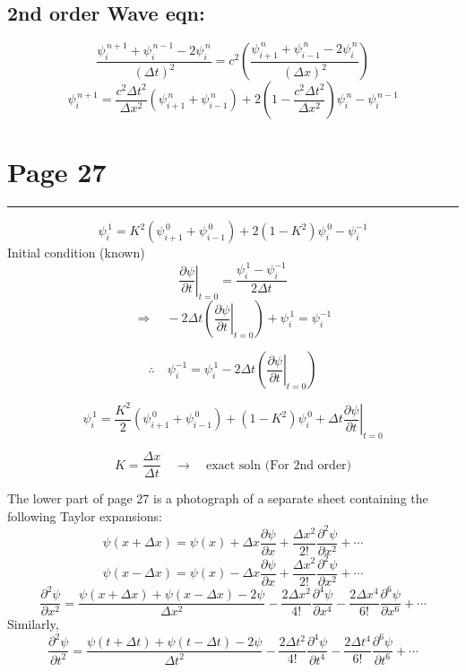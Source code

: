 \documentclass[11pt,a4paper]{article}
\newcommand{\pagehead}[1]{%
  \clearpage
  \section*{Page #1}
  \vspace{-0.6em}
  {\color{black!45}\rule{\linewidth}{0.5pt}}
  \vspace{0.4em}
}
\begin{document}
\subsection*{2nd order Wave eqn:}
\[
\frac{\psi_i^{\,n+1}+\psi_i^{\,n-1}-2\psi_i^{\,n}}{(\Delta t)^2}
=c^2\left(
\frac{\psi_{i+1}^{\,n}+\psi_{i-1}^{\,n}-2\psi_i^{\,n}}{(\Delta x)^2}
\right)
\]
\[
\psi_i^{\,n+1}
=\frac{c^2\Delta t^2}{\Delta x^2}
\left(\psi_{i+1}^{\,n}+\psi_{i-1}^{\,n}\right)
+2\left(1-\frac{c^2\Delta t^2}{\Delta x^2}\right)\psi_i^{\,n}
-\psi_i^{\,n-1}
\]

\pagehead{27}

\[
\psi_i^{\,1}=K^2\left(\psi_{i+1}^{\,0}+\psi_{i-1}^{\,0}\right)
+2\left(1-K^2\right)\psi_i^{\,0}-\psi_i^{-1}
\]
Initial condition (known)
\[
\left.\frac{\partial\psi}{\partial t}\right|_{t=0}
=\frac{\psi_i^{\,1}-\psi_i^{-1}}{2\Delta t}
\]
\[
\Rightarrow\quad -2\Delta t\left(\left.\frac{\partial\psi}{\partial t}
\right|_{t=0}\right)+\psi_i^{\,1}=\psi_i^{-1}
\]
\begin{handbox}
\[
\therefore\quad \psi_i^{-1}
=\psi_i^{\,1}-2\Delta t\left(\left.\frac{\partial\psi}{\partial t}
\right|_{t=0}\right)
\]
\end{handbox}
\begin{handbox}
\[
\psi_i^{\,1}
=\frac{K^2}{2}\left(\psi_{i+1}^{\,0}+\psi_{i-1}^{\,0}\right)
+\left(1-K^2\right)\psi_i^{\,0}
+\Delta t\left.\frac{\partial\psi}{\partial t}\right|_{t=0}
\]
\end{handbox}
\[
K=\frac{\Delta x}{\Delta t}
\quad\longrightarrow\quad \text{exact soln (For 2nd order)}
\]

\begin{notebox}
The lower part of page 27 is a photograph of a separate sheet containing the
following Taylor expansions:
\[
\psi(x+\Delta x)=\psi(x)+\Delta x\frac{\partial\psi}{\partial x}
+\frac{\Delta x^2}{2!}\frac{\partial^2\psi}{\partial x^2}+\cdots
\]
\[
\psi(x-\Delta x)=\psi(x)-\Delta x\frac{\partial\psi}{\partial x}
+\frac{\Delta x^2}{2!}\frac{\partial^2\psi}{\partial x^2}+\cdots
\]
\[
\frac{\partial^2\psi}{\partial x^2}
=\frac{\psi(x+\Delta x)+\psi(x-\Delta x)-2\psi}{\Delta x^2}
-\frac{2\Delta x^2}{4!}\frac{\partial^4\psi}{\partial x^4}
-\frac{2\Delta x^4}{6!}\frac{\partial^6\psi}{\partial x^6}+\cdots
\]
Similarly,
\[
\frac{\partial^2\psi}{\partial t^2}
=\frac{\psi(t+\Delta t)+\psi(t-\Delta t)-2\psi}{\Delta t^2}
-\frac{2\Delta t^2}{4!}\frac{\partial^4\psi}{\partial t^4}
-\frac{2\Delta t^4}{6!}\frac{\partial^6\psi}{\partial t^6}+\cdots
\]
\end{notebox}
\end{document}
